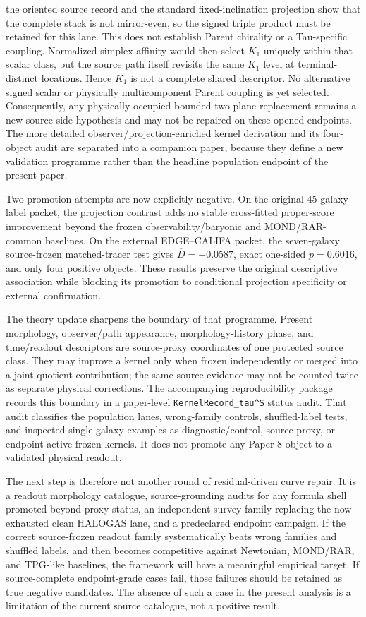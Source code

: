 \documentclass[11pt]{article}
\begin{document}
the oriented source record and the standard fixed-inclination projection show
that the complete stack is not mirror-even, so the signed triple product must
be retained for this lane.  This does not establish Parent chirality or a
Tau-specific coupling.  Normalized-simplex affinity would then select
\(K_1\) uniquely within that scalar class, but the source path itself revisits
the same \(K_1\) level at terminal-distinct locations.  Hence \(K_1\) is not a
complete shared descriptor.  No alternative signed scalar or physically
multicomponent Parent coupling is yet selected.  Consequently,
any physically occupied bounded two-plane replacement
remains a new source-side hypothesis and may not be repaired on these opened endpoints.  The
more detailed observer/projection-enriched kernel derivation and its
four-object audit are separated into a companion paper, because they define a
new validation programme rather than the headline population endpoint of the
present paper.

Two promotion attempts are now explicitly negative.  On the original
45-galaxy label packet, the projection contrast adds no stable cross-fitted
proper-score improvement beyond the frozen observability/baryonic and
MOND/RAR-common baselines.  On the external EDGE--CALIFA packet, the
seven-galaxy source-frozen matched-tracer test gives
\(\overline D=-0.0587\), exact one-sided \(p=0.6016\), and only four positive
objects.  These results preserve the original descriptive association while
blocking its promotion to conditional projection specificity or external
confirmation.

The theory update sharpens the boundary of that programme.  Present morphology,
observer/path appearance, morphology-history phase, and time/readout
descriptors are source-proxy coordinates of one protected source class.  They
may improve a kernel only when frozen independently or merged into a joint
quotient contribution; the same source evidence may not be counted twice as
separate physical corrections.
The accompanying reproducibility package records this boundary in a
paper-level \texttt{KernelRecord\_tau\^{}S} status audit.  That audit classifies the
population lanes, wrong-family controls, shuffled-label tests, and inspected
single-galaxy examples as diagnostic/control, source-proxy, or endpoint-active
frozen kernels.  It does not promote any Paper 8 object to a validated physical
readout.

The next step is therefore not another round of residual-driven curve repair.
It is a readout morphology catalogue, source-grounding audits for any formula
shell promoted beyond proxy status, an independent survey family replacing the
now-exhausted clean HALOGAS lane, and a predeclared endpoint campaign.  If
the correct source-frozen readout family systematically beats wrong families and
shuffled labels, and then becomes competitive against Newtonian, MOND/RAR, and
TPG-like baselines, the framework will have a meaningful empirical target.  If
source-complete endpoint-grade cases fail, those failures should be retained as
true negative candidates.  The absence of such a case in the present analysis
is a limitation of the current source catalogue, not a positive result.
\end{document}
